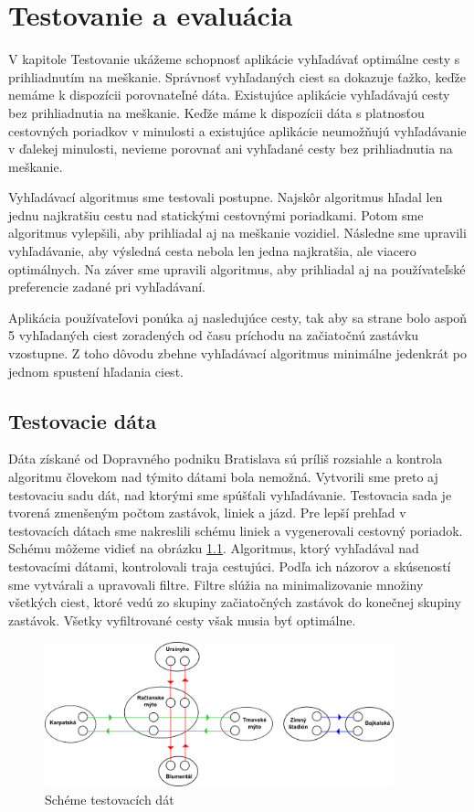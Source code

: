  \chapter{Testovanie a evaluácia}
\label{kap:tes}

V kapitole Testovanie ukážeme schopnosť aplikácie vyhľadávať optimálne cesty s prihliadnutím na meškanie. Správnosť vyhľadaných ciest sa dokazuje ťažko, keďže nemáme k dispozícii porovnateľné dáta. Existujúce aplikácie vyhľadávajú cesty bez prihliadnutia na meškanie. Keďže máme k dispozícii dáta s platnosťou cestovných poriadkov v minulosti a existujúce aplikácie neumožňujú vyhľadávanie v ďalekej minulosti, nevieme porovnať ani vyhľadané cesty bez prihliadnutia na meškanie. 

Vyhľadávací algoritmus sme testovali postupne. Najskôr algoritmus hľadal len jednu najkratšiu cestu nad statickými cestovnými poriadkami. Potom sme algoritmus vylepšili, aby prihliadal aj na meškanie vozidiel. Následne sme upravili vyhľadávanie, aby výsledná cesta nebola len jedna najkratšia, ale viacero optimálnych. Na záver sme upravili algoritmus, aby prihliadal aj na používateľské preferencie zadané pri vyhľadávaní.

Aplikácia používateľovi ponúka aj nasledujúce cesty, tak aby sa strane bolo aspoň 5 vyhľadaných ciest zoradených od času príchodu na začiatočnú zastávku vzostupne. Z toho dôvodu zbehne vyhľadávací algoritmus minimálne jedenkrát po jednom spustení hľadania ciest.

\section{Testovacie dáta}

Dáta získané od Dopravného podniku Bratislava sú príliš rozsiahle a kontrola algoritmu človekom nad týmito dátami bola nemožná. Vytvorili sme preto aj testovaciu sadu dát, nad ktorými sme spúšťali vyhľadávanie. Testovacia sada je tvorená zmenšeným počtom zastávok, liniek a jázd. Pre lepší prehľad v testovacích dátach sme nakreslili schému liniek a vygenerovali cestovný poriadok. Schému môžeme vidieť na obrázku \ref{fig:test-schema}. Algoritmus, ktorý vyhľadával nad testovacími dátami, kontrolovali traja cestujúci. Podľa ich názorov a skúseností sme vytvárali a upravovali filtre. Filtre slúžia na minimalizovanie množiny všetkých ciest, ktoré vedú zo skupiny začiatočných zastávok do konečnej skupiny zastávok. Všetky vyfiltrované cesty však musia byť optimálne.

\begin{figure}[H]
\centerline{\includegraphics[width=0.9\textwidth]{images/test-schema}}
\caption[Schéma testovacích dát]{Schéme testovacích dát}
\label{fig:test-schema}
\end{figure}

